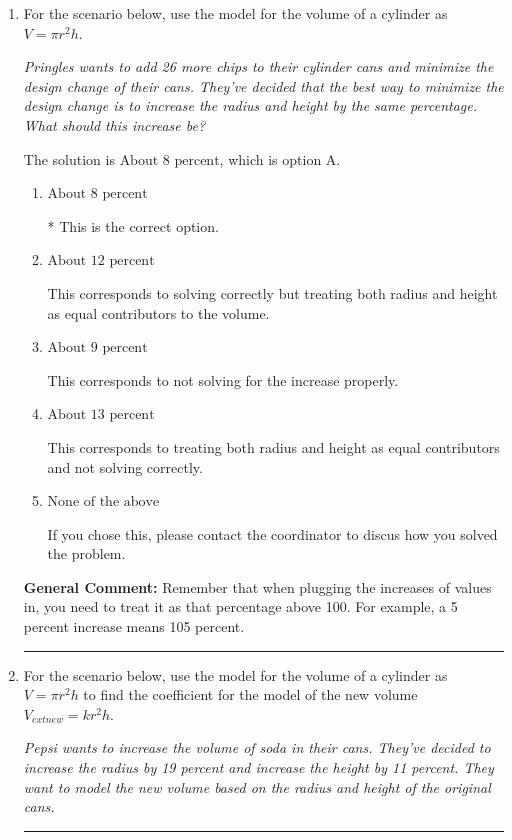 \documentclass{extbook}[14pt]
\newcommand{\litem}[1]{\item #1

\rule{\textwidth}{0.4pt}}
\begin{document}
\begin{enumerate}\litem{
For the scenario below, use the model for the volume of a cylinder as $V = \pi r^2 h$.

\begin{center}
    \textit{ Pringles wants to add 26 \text{percent} more chips to their cylinder cans and minimize the design change of their cans. They've decided that the best way to minimize the design change is to increase the radius and height by the same percentage. What should this increase be? }
\end{center}


The solution is \( \text{About } 8 \text{ percent} \), which is option A.\begin{enumerate}[label=\Alph*.]
\item \( \text{About } 8 \text{ percent} \)

* This is the correct option.
\item \( \text{About } 12 \text{ percent} \)

This corresponds to solving correctly but treating both radius and height as equal contributors to the volume.
\item \( \text{About } 9 \text{ percent} \)

This corresponds to not solving for the increase properly.
\item \( \text{About } 13 \text{ percent} \)

This corresponds to treating both radius and height as equal contributors and not solving correctly.
\item \( \text{None of the above} \)

If you chose this, please contact the coordinator to discus how you solved the problem.
\end{enumerate}

\textbf{General Comment:} Remember that when plugging the increases of values in, you need to treat it as that percentage above 100. For example, a 5 percent increase means 105 percent.
}
\litem{
For the scenario below, use the model for the volume of a cylinder as $V = \pi r^2 h$ to find the coefficient for the model of the new volume $V_{	ext{new}} = k r^2 h$.

\begin{center}
    \textit{ Pepsi wants to increase the volume of soda in their cans. They've decided to increase the radius by 19 percent and increase the height by 11 percent. They want to model the new volume based on the radius and height of the original cans. }
\end{center}


}
\end{enumerate}
\end{document}
